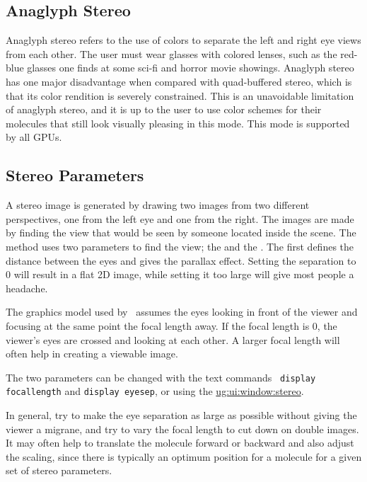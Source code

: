 \subsection{Anaglyph Stereo}
Anaglyph stereo refers to the use of colors to separate the left and
right eye views from each other.  The user must wear glasses with 
colored lenses, such as the red-blue glasses one finds at some sci-fi
and horror movie showings.
Anaglyph stereo has one major disadvantage when compared with quad-buffered
stereo, which is that its color rendition is severely constrained.
This is an unavoidable limitation of anaglyph stereo, and it is up to 
the user to use color schemes for their molecules that still look 
visually pleasing in this mode.
This mode is supported by all GPUs.


\subsection{Stereo Parameters}
  A stereo image is generated by drawing two images from two
different perspectives, one from the left eye and one from the right.
The images are made by finding the view that would be seen by someone
located inside the scene.  The method uses two parameters to find the
view; the  and the
.  The first
defines the distance between the eyes and gives the parallax effect.
Setting the separation to 0 will result in a flat 2D image, while
setting it too large will give most people a headache.

The graphics model used by \VMD\ assumes the eyes looking in front of
the viewer and focusing at the same point the focal length away.  If
the focal length is 0, the viewer's eyes are crossed and looking at
each other.  A larger focal length will often help in creating a
viewable image.

  The two parameters can be changed with the text commands {\tt
display focallength} and {\tt display eyesep}, or using the
\hyperref{{\sf Display Settings} window}{{\sf Display Settings} window [\S }{]}{ug:ui:window:stereo}.

In general, try to make the eye separation as large as possible
without giving the viewer a migrane, and try to vary the focal length
to cut down on double images.  It may often help to translate the
molecule forward or backward and also adjust the scaling, since there
is typically an optimum position for a molecule for a given set of
stereo parameters.

